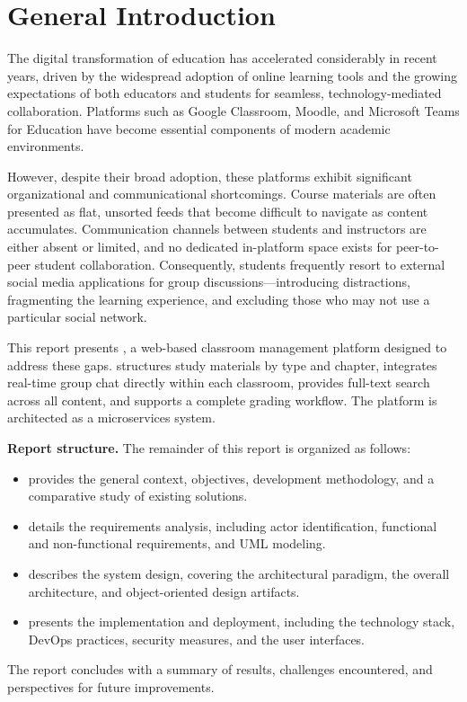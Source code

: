 \chapter*{General Introduction}

The digital transformation of education has accelerated considerably in recent years, driven by the widespread adoption of online learning tools and the growing expectations of both educators and students for seamless, technology-mediated collaboration.
Platforms such as Google Classroom, Moodle, and Microsoft Teams for Education have become essential components of modern academic environments.

However, despite their broad adoption, these platforms exhibit significant organizational and communicational shortcomings.
Course materials are often presented as flat, unsorted feeds that become difficult to navigate as content accumulates.
Communication channels between students and instructors are either absent or limited, and no dedicated in-platform space exists for peer-to-peer student collaboration.
Consequently, students frequently resort to external social media applications for group discussions---introducing distractions, fragmenting the learning experience, and excluding those who may not use a particular social network.

This report presents \eduspace{}, a web-based classroom management platform designed to address these gaps.
\eduspace{} structures study materials by type and chapter, integrates real-time group chat directly within each classroom, provides full-text search across all content, and supports a complete grading workflow.
The platform is architected as a microservices system.

\medskip
\noindent\textbf{Report structure.}\quad
The remainder of this report is organized as follows:

\begin{itemize}[nosep]
  \item {} provides the general context, objectives, development methodology, and a comparative study of existing solutions.
  \item {} details the requirements analysis, including actor identification, functional and non-functional requirements, and UML modeling.
  \item {} describes the system design, covering the architectural paradigm, the overall architecture, and object-oriented design artifacts.
  \item {} presents the implementation and deployment, including the technology stack, DevOps practices, security measures, and the user interfaces.
\end{itemize}

The report concludes with a summary of results, challenges encountered, and perspectives for future improvements.
